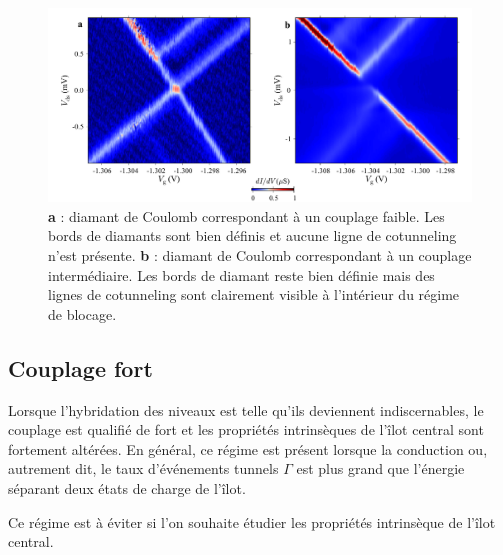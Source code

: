 \begin{figure}
\centering \includegraphics[scale=0.45]{Fabrication/CouplageInt/CouplageInt.pdf}
\caption{\textbf{a} : diamant de Coulomb correspondant à un couplage faible. Les bords de diamants sont bien définis et aucune ligne de cotunneling n'est présente. \textbf{b} : diamant de Coulomb correspondant à un couplage intermédiaire. Les bords de diamant reste bien définie mais des lignes de cotunneling sont clairement visible à l'intérieur du régime de blocage.}
\label{CouplageInt}
\end{figure}


\subsection{Couplage fort}
Lorsque l'hybridation des niveaux est telle qu'ils deviennent indiscernables, le couplage est qualifié de fort et les propriétés intrinsèques de l'îlot central sont fortement altérées. En général, ce régime est présent lorsque la conduction ou, autrement dit, le taux d’événements tunnels $\Gamma$ est plus grand que l'énergie séparant deux états de charge de l'îlot.

Ce régime est à éviter si l'on souhaite étudier les propriétés intrinsèque de l'\^ilot central.
